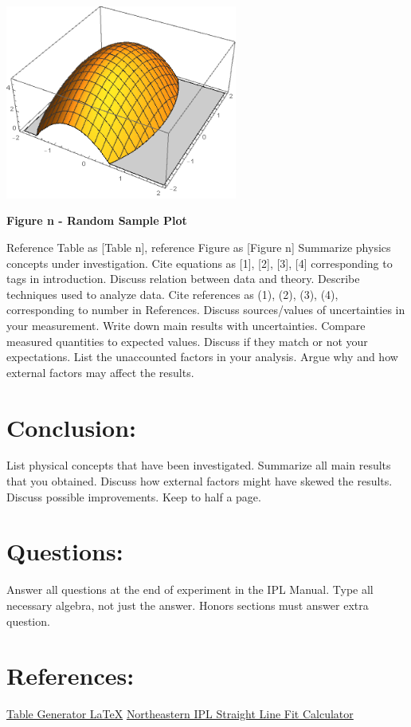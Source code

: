 \documentclass[12pt]{article}
\begin{document}
\begin{outline}[enumerate]
		\begin{center}
			\includegraphics[width=3in]{RandPlot}\\
			\begin{small} \textbf{
				Figure n - Random Sample Plot
			} \end{small}
		\end{center}
				\2 Reference Table as [Table n], reference Figure as [Figure n]
			\1 Summarize physics concepts under investigation.
				\2 Cite equations as [1], [2], [3], [4] corresponding to tags in introduction.
			\1 Discuss relation between data and theory.
		 	\1 Describe techniques used to analyze data.
		 		\2 Cite references as (1), (2), (3), (4), corresponding to number in References.
		 	\1 Discuss sources/values of uncertainties in your measurement.
			\1 Write down main results with uncertainties.
			\1 Compare measured quantities to expected values.
			\1 Discuss if they match or not your expectations.
			\1 List the unaccounted factors in your analysis.
			\1 Argue why and how external factors may affect the results.\\
		\end{outline}
		
	\section*{Conclusion:}
		\begin{outline}[enumerate]
			\1 List physical concepts that have been investigated.
			\1 Summarize all main results that you obtained.
		 	\1 Discuss how external factors might have skewed the results.
			\1 Discuss possible improvements.
			\1 Keep to half a page.
		\end{outline}
		
	\section*{Questions:}
		\begin{outline}[enumerate]
			\1 Answer all questions at the end of experiment in the IPL Manual.
			\1 Type all necessary algebra, not just the answer.
			\1 Honors sections must answer extra question.
		\end{outline}
		
	\section*{References:}
		\begin{outline}[enumerate]
			\1 \href{https://www.tablesgenerator.com/#}{Table Generator \LaTeX}
			\1 \href{https://web.northeastern.edu/ipl/data-analysis/straight-line-fit/}{Northeastern IPL Straight Line Fit Calculator}
		\end{outline}
		
\end{document}
